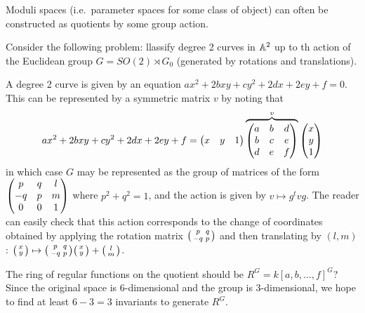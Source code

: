 
Moduli spaces (i.e.~parameter spaces for some class of object) can often be constructed as quotients by some group action.

Consider the following problem: llassify degree 2 curves in $\AA^2$ up to th action of the Euclidean group $G=SO(2)\rtimes G_0$ (generated by rotations and translations).

A degree 2 curve is given by an equation $ax^2+2bxy+cy^2 + 2dx + 2ey +f=0$. This can be represented by a symmetric matrix $v$ by noting that
\[
 ax^2+2bxy+cy^2 + 2dx + 2ey +f=\Matx{x&y&1}\overbrace{\Matx{a&b&d\\ b&c&e\\ d&e&f}}^v\Matx{x\\ y\\ 1}
\]
in which case $G$ may be represented as the group of matrices of the form $\Matx{p&q&l\\-q&p&m\\ 0&0&1}$ where $p^2+q^2=1$, and the action is given by $v\mapsto g^tvg$. The reader can easily check that this action corresponds to the change of coordinates obtained by applying the rotation matrix $\matx{p&q\\ -q&p}$ and then translating by $(l,m)$: $\matx{x\\ y}\mapsto \matx{p&q\\ -q&p}\matx{x\\ y} + \matx{l\\ m}$. 

The ring of regular functions on the quotient should be $R^G=k[a,b,\dots, f]^G$? Since the original space is 6-dimensional and the group is 3-dimensional, we hope to find at least $6-3=3$ invariants to generate $R^G$.

